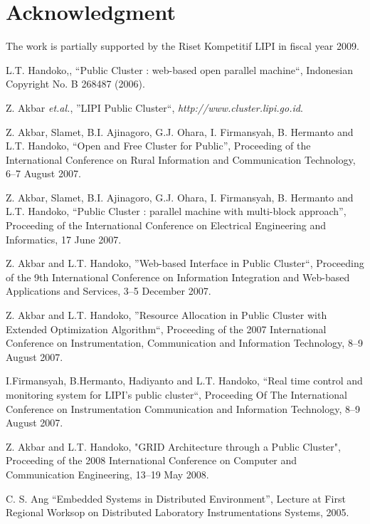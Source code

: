 \documentclass[conference,letterpaper]{IEEEtran}
\begin{document}
\section*{Acknowledgment}

The work is partially supported by the Riset Kompetitif LIPI in fiscal year 2009.

\begin{thebibliography}{1}

	L.T. Handoko,, ``Public Cluster : web-based open parallel machine``, Indonesian Copyright No. B 268487 (2006).

	Z. Akbar \textit{et.al.}, ''LIPI Public Cluster``, \textit{http://www.cluster.lipi.go.id}.

	Z. Akbar, Slamet, B.I. Ajinagoro, G.J. Ohara, I. Firmansyah, B. Hermanto and L.T. Handoko, “Open and Free Cluster for Public”, Proceeding of the International Conference on Rural Information and Communication Technology, 6--7 August 2007.

	Z. Akbar, Slamet, B.I. Ajinagoro, G.J. Ohara, I. Firmansyah, B. Hermanto and L.T. Handoko, “Public Cluster : parallel machine with multi-block approach”, Proceeding of the International Conference on Electrical Engineering and Informatics, 17 June 2007.

	Z. Akbar and L.T. Handoko, ''Web-based Interface in Public Cluster``, Proceeding of the 9th International Conference on Information Integration and Web-based Applications and Services, 3--5 December 2007.

	Z. Akbar and L.T. Handoko, ''Resource Allocation in Public Cluster with Extended Optimization Algorithm``, Proceeding of the 2007 International Conference on Instrumentation, Communication and Information Technology, 8--9 August 2007.

	I.Firmansyah, B.Hermanto, Hadiyanto and L.T. Handoko, “Real time control and monitoring system for LIPI’s public cluster“, Proceeding Of The International Conference on Instrumentation Communication and Information Technology, 8--9 August 2007.

	Z. Akbar and L.T. Handoko, "GRID Architecture through a Public Cluster", Proceeding of the 2008 International Conference on Computer and Communication Engineering, 13--19 May 2008.

	 C. S. Ang  “Embedded Systems in Distributed Environment”,  Lecture at First Regional Worksop on Distributed Laboratory Instrumentations Systems, 2005.


\end{thebibliography}
\end{document}
